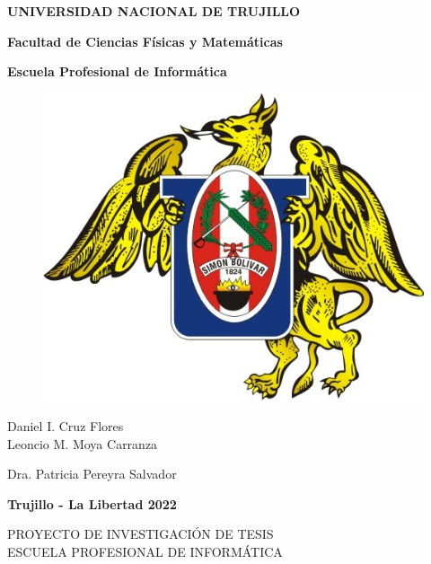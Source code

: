 \documentclass[a4paper, 12pt]{article}
\begin{document}
\begin{center}
 {\bf {\fontsize{14}{16.8}\selectfont UNIVERSIDAD NACIONAL DE TRUJILLO}}     
 
    {\bf{\fontsize{14}{16.8}\selectfont Facultad de Ciencias Físicas y Matemáticas}} 

  {\bf{\fontsize{14}{16.8}\selectfont Escuela Profesional de Informática}}
\end{center}  

\begin{figure}[ht]
\begin{center}
\includegraphics[width=.3\textwidth]{unt}
\end{center}
\end{figure}

\vskip 2cm
\begin{center}
  { \bf {\fontsize{17}{20.4}\selectfont{Desarrollo de un sistema BMS-IoT para el control automatizado del consumo eléctrico basado en el protocolo MQTT}}  } 

 
  \vskip 2cm
  { \bf {\fontsize{17}{20.4}}  }
  
 \vskip 0.25cm 
  
   Daniel I. Cruz Flores \\
   Leoncio M. Moya Carranza
 
	   
  \vskip 1cm
  { \bf {\fontsize{17}{20.4} }  } 
 \vskip 0.25cm 
 
   Dra. Patricia Pereyra Salvador
  
\vskip 4cm


{\bf {\fontsize{14}{16.8}\selectfont Trujillo - La Libertad
\vskip 0.0cm
\hspace*{-0.2cm} 
\vskip 0.1cm
2022 }}
\end{center} 
\newpage

\begin{center}
\Large {PROYECTO DE INVESTIGACIÓN DE TESIS \\
\vskip 0.2cm
 ESCUELA PROFESIONAL DE INFORMÁTICA}
\end{center}
\vskip 1cm
\end{document}

